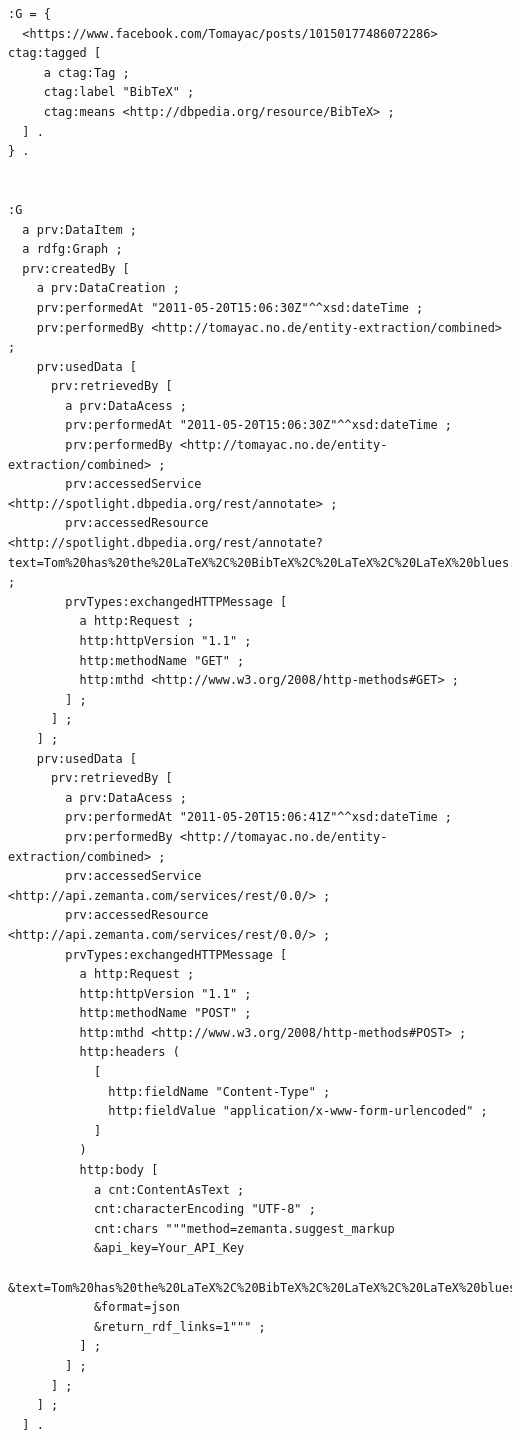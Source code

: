 \begin{lstlisting}
:G = {
  <https://www.facebook.com/Tomayac/posts/10150177486072286> ctag:tagged [
     a ctag:Tag ;
     ctag:label "BibTeX" ;
     ctag:means <http://dbpedia.org/resource/BibTeX> ;
  ] .
} .


:G
  a prv:DataItem ;
  a rdfg:Graph ;
  prv:createdBy [
    a prv:DataCreation ;
    prv:performedAt "2011-05-20T15:06:30Z"^^xsd:dateTime ;
    prv:performedBy <http://tomayac.no.de/entity-extraction/combined> ;
    prv:usedData [
      prv:retrievedBy [
        a prv:DataAcess ;
        prv:performedAt "2011-05-20T15:06:30Z"^^xsd:dateTime ;
        prv:performedBy <http://tomayac.no.de/entity-extraction/combined> ;
        prv:accessedService <http://spotlight.dbpedia.org/rest/annotate> ;
        prv:accessedResource <http://spotlight.dbpedia.org/rest/annotate?text=Tom%20has%20the%20LaTeX%2C%20BibTeX%2C%20LaTeX%2C%20LaTeX%20blues...&confidence=0.4&support=20> ;
        prvTypes:exchangedHTTPMessage [
          a http:Request ;
          http:httpVersion "1.1" ;
          http:methodName "GET" ;
          http:mthd <http://www.w3.org/2008/http-methods#GET> ;
        ] ;
      ] ;
    ] ;
    prv:usedData [
      prv:retrievedBy [
        a prv:DataAcess ;
        prv:performedAt "2011-05-20T15:06:41Z"^^xsd:dateTime ;
        prv:performedBy <http://tomayac.no.de/entity-extraction/combined> ;
        prv:accessedService <http://api.zemanta.com/services/rest/0.0/> ;
        prv:accessedResource <http://api.zemanta.com/services/rest/0.0/> ;
        prvTypes:exchangedHTTPMessage [
          a http:Request ;
          http:httpVersion "1.1" ;
          http:methodName "POST" ;
          http:mthd <http://www.w3.org/2008/http-methods#POST> ;
          http:headers (
            [
              http:fieldName "Content-Type" ;
              http:fieldValue "application/x-www-form-urlencoded" ;
            ]   
          )
          http:body [
            a cnt:ContentAsText ;
            cnt:characterEncoding "UTF-8" ;
            cnt:chars """method=zemanta.suggest_markup
            &api_key=Your_API_Key
            &text=Tom%20has%20the%20LaTeX%2C%20BibTeX%2C%20LaTeX%2C%20LaTeX%20blues...
            &format=json
            &return_rdf_links=1""" ;
          ] ;
        ] ;
      ] ;
    ] ;
  ] .
\end{lstlisting}

